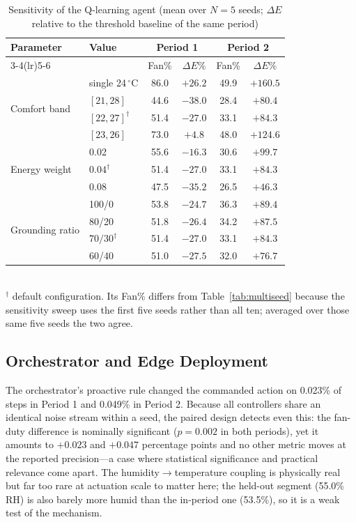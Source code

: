 \documentclass[conference]{IEEEtran}
\begin{document}
\begin{table}[t]
\caption{Sensitivity of the Q-learning agent (mean over $N=5$ seeds;
$\Delta E$ relative to the threshold baseline of the same period)}
\label{tab:sensitivity}
\centering
\footnotesize
\setlength{\tabcolsep}{3pt}
\begin{tabular}{llcccc}
\toprule
\multirow{2}{*}{Parameter} & \multirow{2}{*}{Value} &
\multicolumn{2}{c}{Period 1} & \multicolumn{2}{c}{Period 2} \\
\cmidrule(lr){3-4}\cmidrule(lr){5-6}
 & & Fan\% & $\Delta E$\% & Fan\% & $\Delta E$\% \\
\midrule
\multirow{4}{*}{Comfort band}
 & single 24\,$^{\circ}$C & 86.0 & $+26.2$ & 49.9 & $+160.5$ \\
 & $[21,28]$ & 44.6 & $-38.0$ & 28.4 & $+80.4$ \\
 & $[22,27]^{\dagger}$ & 51.4 & $-27.0$ & 33.1 & $+84.3$ \\
 & $[23,26]$ & 73.0 & $+4.8$ & 48.0 & $+124.6$ \\
\midrule
\multirow{3}{*}{Energy weight}
 & 0.02 & 55.6 & $-16.3$ & 30.6 & $+99.7$ \\
 & $0.04^{\dagger}$ & 51.4 & $-27.0$ & 33.1 & $+84.3$ \\
 & 0.08 & 47.5 & $-35.2$ & 26.5 & $+46.3$ \\
\midrule
\multirow{4}{*}{Grounding ratio}
 & 100/0 & 53.8 & $-24.7$ & 36.3 & $+89.4$ \\
 & 80/20 & 51.8 & $-26.4$ & 34.2 & $+87.5$ \\
 & $70/30^{\dagger}$ & 51.4 & $-27.0$ & 33.1 & $+84.3$ \\
 & 60/40 & 51.0 & $-27.5$ & 32.0 & $+76.7$ \\
\bottomrule
\end{tabular}
\\[2pt]
\footnotesize $^{\dagger}$ default configuration. Its Fan\% differs from
Table~\ref{tab:multiseed} because the sensitivity sweep uses the first five
seeds rather than all ten; averaged over those same five seeds the two agree.
\end{table}

\subsection{Orchestrator and Edge Deployment}
The orchestrator's proactive rule changed the commanded action on 0.023\% of
steps in Period 1 and 0.049\% in Period 2. Because all controllers share an
identical noise stream within a seed, the paired design detects even this: the
fan-duty difference is nominally significant ($p=0.002$ in both periods), yet it
amounts to $+0.023$ and $+0.047$ percentage points and no other metric moves at
the reported precision---a case where statistical significance and practical
relevance come apart. The humidity$\rightarrow$temperature coupling is physically
real but far too rare at actuation scale to matter here; the held-out segment
(55.0\% RH) is also barely more humid than the in-period one (53.5\%), so it is a
weak test of the mechanism.
\end{document}
